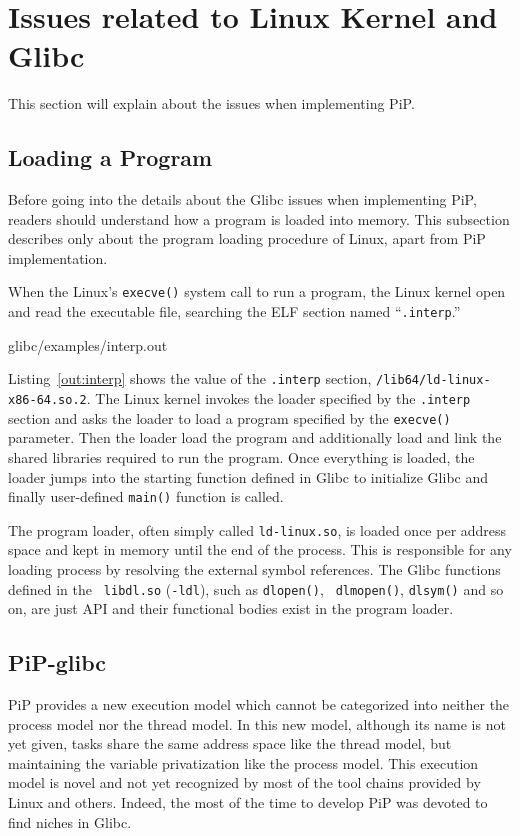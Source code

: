 
\section{Issues related to Linux Kernel and Glibc}

This section will explain about the issues when implementing PiP. 

\subsection{Loading a Program}

Before going into the details about the Glibc issues when implementing
PiP, readers should understand how a program is loaded into
memory. This subsection describes only about the program loading
procedure of Linux, apart from PiP implementation.

When the Linux's {\tt execve()} system call to run a program, the
Linux kernel open and read the executable file, searching the ELF
section named ``{\tt .interp}.''

 {glibc/examples/interp.out}

Listing~\ref{out:interp} shows the value of the {\tt .interp} section,
{\tt /lib64/ld-linux-x86-64.so.2}. The Linux kernel
invokes the loader specified by the {\tt .interp} section and asks the
loader to load a program specified by the {\tt execve()} parameter.
Then the loader load the program and additionally load and link the shared
libraries required to run the program. Once everything is loaded, the
loader jumps into the starting function defined in Glibc to initialize
Glibc and finally user-defined {\tt main()} function is called.

The program loader, often simply called {\tt ld-linux.so}, is loaded
once per address space and kept in memory until the end of the
process. This is responsible for any loading process by resolving the
external symbol references. The Glibc functions defined in the {\tt
  libdl.so} ({\tt -ldl}), such as {\tt   dlopen()}, {\tt
  dlmopen()}, {\tt dlsym()} and so on, are just API 
and their functional bodies exist in the program loader.

\subsection{PiP-glibc}

PiP provides a new execution model which cannot be categorized into
neither the process model nor the thread model. In this new model,
although its name is not yet given, tasks share the same address
space like the thread model, but maintaining the variable
privatization like the process model. This execution
model is novel and not yet recognized by most of the tool chains
provided by Linux and others. Indeed, the most of the time to develop
PiP was devoted to find niches in Glibc.

